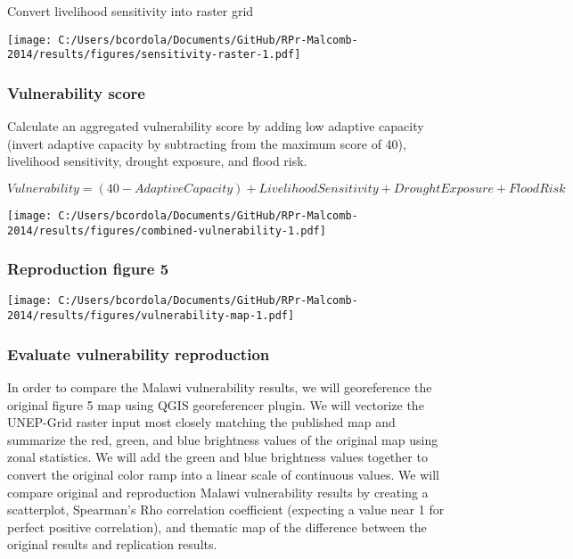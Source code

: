 \documentclass[
]{article}
\begin{document}
Convert livelihood sensitivity into raster grid

\texttt{[image: C:/Users/bcordola/Documents/GitHub/RPr-Malcomb-2014/results/figures/sensitivity-raster-1.pdf]}

\hypertarget{vulnerability-score}{%
\subsubsection{Vulnerability score}\label{vulnerability-score}}

Calculate an aggregated vulnerability score by adding low adaptive
capacity (invert adaptive capacity by subtracting from the maximum score
of 40), livelihood sensitivity, drought exposure, and flood risk.

\[
Vulnerability = (40 - Adaptive Capacity) + Livelihood Sensitivity + Drought Exposure + Flood Risk
\]

\texttt{[image: C:/Users/bcordola/Documents/GitHub/RPr-Malcomb-2014/results/figures/combined-vulnerability-1.pdf]}

\hypertarget{reproduction-figure-5}{%
\subsubsection{Reproduction figure 5}\label{reproduction-figure-5}}

\texttt{[image: C:/Users/bcordola/Documents/GitHub/RPr-Malcomb-2014/results/figures/vulnerability-map-1.pdf]}

\hypertarget{evaluate-vulnerability-reproduction}{%
\subsubsection{Evaluate vulnerability
reproduction}\label{evaluate-vulnerability-reproduction}}

In order to compare the Malawi vulnerability results, we will
georeference the original figure 5 map using QGIS georeferencer plugin.
We will vectorize the UNEP-Grid raster input most closely matching the
published map and summarize the red, green, and blue brightness values
of the original map using zonal statistics. We will add the green and
blue brightness values together to convert the original color ramp into
a linear scale of continuous values. We will compare original and
reproduction Malawi vulnerability results by creating a scatterplot,
Spearman's Rho correlation coefficient (expecting a value near 1 for
perfect positive correlation), and thematic map of the difference
between the original results and replication results.
\end{document}
